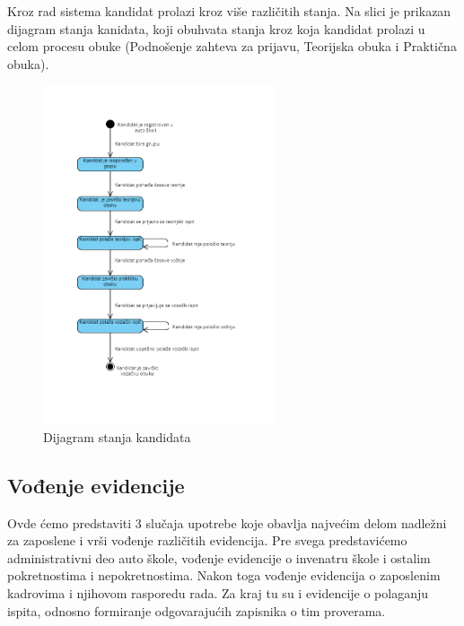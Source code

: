 Kroz rad sistema kandidat prolazi kroz više različitih stanja. Na slici  \label{fig:stanja_kandidat} je prikazan dijagram stanja kanidata, 
koji obuhvata stanja kroz koja kandidat prolazi u celom procesu obuke (Podnošenje zahteva za prijavu, Teorijska obuka i Praktična obuka).

\begin{figure}[H]
    \begin{center}
        \includegraphics[height=100mm]{Diagrams/dijagram_stanja_kandidata.png}
    \end{center}
    \caption {Dijagram stanja kandidata}
    \label{fig:stanja_kandidat}

\end{figure}




\subsection {Vođenje evidencije}
Ovde ćemo predstaviti 3 slučaja upotrebe koje obavlja najvećim delom  nadležni za zaposlene i vrši vođenje različitih evidencija.
Pre svega predstavićemo administrativni deo auto škole, vođenje evidencije o invenatru škole i ostalim pokretnostima i nepokretnostima.
Nakon toga vođenje evidencija o zaposlenim kadrovima i njihovom rasporedu rada. Za kraj tu su i evidencije o polaganju ispita, odnosno formiranje 
odgovarajućih zapisnika o tim proverama.

